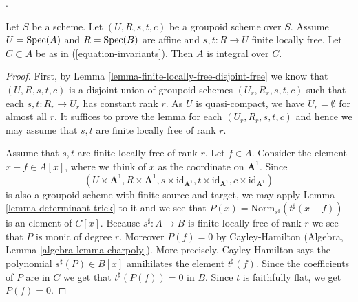 \begin{lemma}
\label{lemma-integral-over-invariants}
\begin{reference}
\cite[Expos\'e 212, Th\'eor\`eme 5.1 (i), p. 110]{FGA}.
\end{reference}
Let $S$ be a scheme. Let $(U, R, s, t, c)$ be a groupoid scheme over $S$.
Assume $U = \mathop{\mathrm{Spec}}(A)$ and $R = \mathop{\mathrm{Spec}}(B)$ are affine and
$s, t : R \to U$ finite locally free.
Let $C \subset A$ be as in (\ref{equation-invariants}).
Then $A$ is integral over $C$.
\end{lemma}

\begin{proof}
First, by Lemma \ref{lemma-finite-locally-free-disjoint-free}
we know that $(U, R, s, t, c)$ is a disjoint union
of groupoid schemes $(U_r, R_r, s, t, c)$ such that each $s, t : R_r \to U_r$
has constant rank $r$. As $U$ is quasi-compact, we have $U_r = \emptyset$ for
almost all $r$. It suffices to prove the lemma for each $(U_r, R_r, s, t, c)$
and hence we may assume that $s, t$ are finite locally free of rank $r$.

\medskip\noindent
Assume that $s, t$ are finite locally free of rank $r$.
Let $f \in A$. Consider the element $x - f \in A[x]$, where we think
of $x$ as the coordinate on $\mathbf{A}^1$.
Since
$$
(U \times \mathbf{A}^1, R \times \mathbf{A}^1,
s \times \text{id}_{\mathbf{A}^1},
t \times \text{id}_{\mathbf{A}^1},
c \times \text{id}_{\mathbf{A}^1})
$$
is also a groupoid scheme with finite source and target, we may apply
Lemma \ref{lemma-determinant-trick} to it and we see that
$P(x) = \text{Norm}_{s^\sharp}(t^\sharp(x - f))$
is an element of $C[x]$. Because $s^\sharp : A \to B$ is finite locally
free of rank $r$ we see that $P$ is monic of degree $r$.
Moreover $P(f) = 0$ by Cayley-Hamilton
(Algebra, Lemma \ref{algebra-lemma-charpoly}).
More precisely, Cayley-Hamilton says the polynomial
$s^\sharp(P) \in B[x]$ annihilates the element $t^\sharp(f)$.
Since the coefficients of $P$ are in $C$ we get that
$t^\sharp(P(f)) = 0$ in $B$. Since $t$ is faithfully flat,
we get $P(f) = 0$.
\end{proof}

